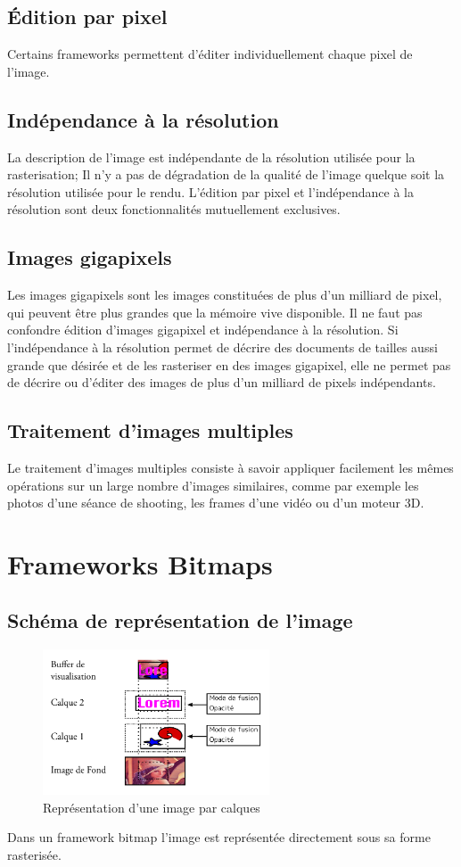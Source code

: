 		\subsection{Édition par pixel}
			Certains frameworks permettent d'éditer individuellement chaque pixel de l'image. 
		\subsection{Indépendance à la résolution}
			La description de l'image est indépendante de la résolution utilisée pour la rasterisation; Il n'y a pas de dégradation
			de la qualité de l'image quelque soit la résolution utilisée pour le rendu. L'édition par pixel et l'indépendance à la résolution
			sont deux fonctionnalités mutuellement exclusives.
		\subsection{Images gigapixels}
			Les images gigapixels sont les images constituées de plus d'un milliard de pixel, qui peuvent être plus grandes que la mémoire
			vive disponible. Il ne faut pas confondre édition d'images gigapixel et indépendance à la résolution.
			Si l'indépendance à la résolution permet de décrire des documents de tailles aussi grande
			que désirée et de les rasteriser en des images gigapixel, elle ne permet pas de décrire ou d'éditer des images
			de plus d'un milliard de pixels indépendants. 

		\subsection{Traitement d'images multiples}
			Le traitement d'images multiples consiste à savoir appliquer facilement les mêmes opérations sur un large nombre d'images similaires, 
			comme par exemple les photos d'une séance de shooting, les frames d'une vidéo ou d'un moteur 3D.

	\section{Frameworks Bitmaps}
		\subsection{Schéma de représentation de l'image}
			\begin{figure}[h]
				\centering
				\includegraphics[width=0.6\textwidth]{images/calques}
				\caption{Représentation d'une image par calques}
				\label{fig:editbitmap}
			\end{figure}
			Dans un framework bitmap l'image est représentée directement sous sa forme rasterisée. 
			
